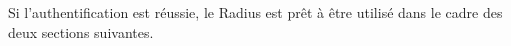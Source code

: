 Si l'authentification est réussie, le Radius est prêt à être utilisé dans le cadre des deux sections suivantes.
\begin{comment}
\subsection{Contrôle d'accès au réseau}
\subsubsection{Protocole 802.1x}

Le contrôle d'accès au réseau permet de déterminer si un utilisateur a le droit de relier sa machine au réseau ou non. Concrétement, le port du commutateur correspondant sera bloqué par défaut, et ne commencera à laisser passer le trafic qu'en cas d'authentification réussie. Il déterminera le VLAN à utiliser pour le port avant de l'ouvrir, en fonction de l'utilisateur reconnu. Ce mode de fonctionnement est permis par le protocole 802.1x décrit dans la section \ref{dot1x} page \pageref{dot1x}, qui décrit les interactions avec le serveur Radius.

\subsubsection{Configurer le commutateur}

Enregistrer le serveur Radius (avec le secret comme clé)~:
\begin{verbatim}
Switch# conf t
Switch(config)# aaa new-model
Switch(config)# radius-server host 192.168.1.1 auth-port 1812 key poil
\end{verbatim}

Configurer un port en dot1x, en suivant la procédure décrite dans la section \ref{dot1x} page \pageref{dot1x}.

Ajouter une règle d'authentification via le Radius pour le dot1x~:
\begin{verbatim}
Switch(config)# aaa authentication dot1x poil group radius
\end{verbatim}

\subsubsection{Configurer le client}

Le supplicant permet au client de s'authentifier auprès du commutateur, pour que celui-ci puisse interroger le serveur Radius au moment de la connexion physique.


\end{comment}
